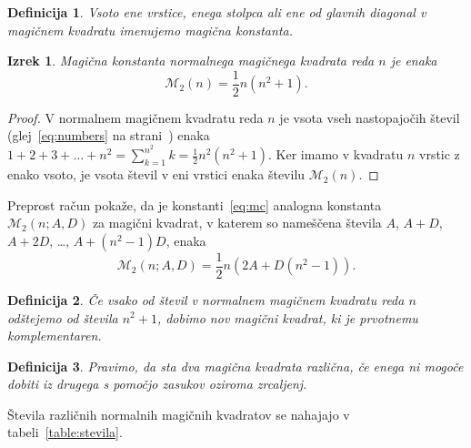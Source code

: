\documentclass[a4paper,12pt]{article}
\newtheorem{definicija}{Definicija}
\newtheorem{izrek}{Izrek}
\begin{document}
\begin{definicija}
      Vsoto ene vrstice, enega stolpca ali ene od glavnih diagonal
      v magičnem kvadratu imenujemo \emph{magična konstanta}.
\end{definicija}

\newcommand{\m}{\mathcal{M}_2}

\begin{izrek}
   Magična konstanta normalnega magičnega kvadrata reda \(n\)
   je enaka
   \begin{equation}
      \label{eq:mc}
      \m(n)=\frac{1}{2}n(n^2+1).
   \end{equation}
\end{izrek}

\begin{proof}
   V normalnem magičnem kvadratu reda \(n\) je vsota vseh nastopajočih
   števil (glej~\eqref{eq:numbers} na strani~\pageref{eq:numbers}) enaka
   \(1+2+3+\ldots+n^2=\sum_{k=1}^{n^2}k=\frac{1}{2}n^2(n^2+1)\). Ker imamo
   v kvadratu \(n\) vrstic z enako vsoto, je vsota števil v eni vrstici
   enaka številu \(\m(n)\). %
\end{proof}

Preprost račun pokaže, da je konstanti~\eqref{eq:mc} analogna konstanta
\(\m(n;A,D)\) za magični kvadrat, v katerem so nameščena števila
\(A\), \(A+D\), \(A+2D\), \ldots, \(A+(n^2-1)D\), enaka %
\[
\m(n;A,D)=\frac{1}{2}n\left(2A+D(n^2-1)\right).
\]

\begin{definicija}
      Če vsako od števil v normalnem magičnem kvadratu reda \(n\) odštejemo
      od števila \(n^2+1\), dobimo nov magični kvadrat, ki je prvotnemu
      \emph{komplementaren}.
\end{definicija}

\begin{definicija}
      Pravimo, da sta dva magična kvadrata \emph{različna}, če enega ni mogoče dobiti
      iz drugega s pomočjo zasukov oziroma zrcaljenj.
\end{definicija}

Števila različnih normalnih magičnih kvadratov se nahajajo v tabeli~\ref{table:stevila}.
\end{document}
